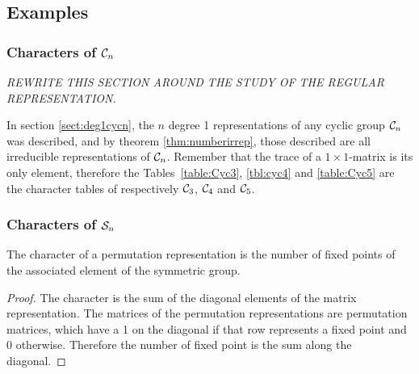 \subsection{Examples}



\subsubsection{Characters of $\mathcal{C}_n$}

\textit{REWRITE THIS SECTION AROUND THE STUDY OF THE REGULAR REPRESENTATION.}

\begin{example}
	In section \ref{sect:deg1cycn}, the $n$ degree 1 representations of any cyclic group $\mathcal{C}_n$ was described, and by theorem \ref{thm:numberirrep}, those described are all irreducible representations of $\mathcal{C}_n$. Remember that the trace of a $1 \times 1$-matrix is its only element, therefore the Tables~\ref{table:Cyc3}, \ref{tbl:cyc4} and \ref{table:Cyc5} are the character tables of respectively $\mathcal{C}_3$, $\mathcal{C}_4$ and $\mathcal{C}_5$.
\end{example}

\subsubsection{Characters of $\mathcal{S}_n$}

\begin{theorem}
	The character of a permutation representation is the number of fixed points of the associated element of the symmetric group.
\end{theorem}
\begin{proof}
	The character is the sum of the diagonal elements of the matrix representation. The matrices of the permutation representations are permutation matrices, which have a 1 on the diagonal if that row represents a fixed point and 0 otherwise. Therefore the number of fixed point is the sum along the diagonal.
\end{proof}

